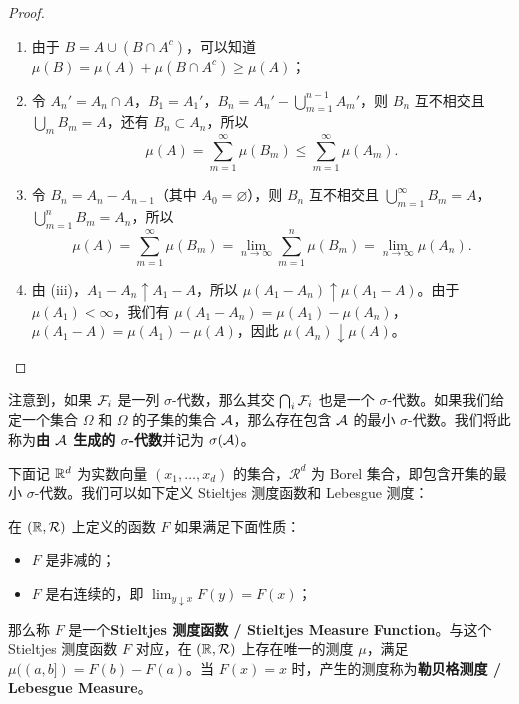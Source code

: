\begin{proof}
    \begin{enumerate}
        \item 由于 $B = A \cup (B \cap A^c)$，可以知道 $\mu(B) = \mu(A) + \mu(B \cap A^c) \ge \mu(A)$；
        \item 令 $A_n' = A_n \cap A$，$B_1 = A_1'$，$B_n = A_n' - \bigcup_{m=1}^{n-1} A_m'$，则 $B_n$ 互不相交且 $\bigcup_m B_m = A$，还有 $B_n \subset A_n$，所以
              \[
                  \mu(A) = \sum_{m=1}^{\infty} \mu(B_m) \le \sum_{m=1}^{\infty} \mu(A_m).
              \]
        \item 令 $B_n = A_n - A_{n-1}$（其中 $A_0 = \varnothing$），则 $B_n$ 互不相交且 $\bigcup_{m=1}^\infty B_m = A$，$\bigcup_{m=1}^n B_m = A_n$，所以
              \[
                  \mu(A) = \sum_{m=1}^{\infty} \mu(B_m) = \lim_{n \to \infty} \sum_{m=1}^n \mu(B_m) = \lim_{n \to \infty} \mu(A_n).
              \]
        \item 由 (iii)，$A_1 - A_n \uparrow A_1 - A$，所以 $\mu(A_1 - A_n) \uparrow \mu(A_1 - A)$。由于 $\mu(A_1) < \infty$，我们有 $\mu(A_1 - A_n) = \mu(A_1) - \mu(A_n)$，$\mu(A_1 - A) = \mu(A_1) - \mu(A)$，因此 $\mu(A_n) \downarrow \mu(A)$。
    \end{enumerate}
\end{proof}

注意到，如果 $\mathcal{F}_i$ 是一列 $\sigma$-代数，那么其交 $\bigcap_i \mathcal{F}_i$ 也是一个 $\sigma$-代数。如果我们给定一个集合 $\Omega$ 和 $\Omega$ 的子集的集合 $\mathcal{A}$，那么存在包含 $\mathcal{A}$ 的最小 $\sigma$-代数。我们将此称为{\normalfont\bfseries 由 $\mathcal{A}$ 生成的 $\sigma$-代数}并记为 $\sigma(\mathcal{A})$。

下面记 $\mathbb{R}^d$ 为实数向量 $(x_1, \dots, x_d)$ 的集合，$\mathcal{R}^d$ 为 Borel 集合，即包含开集的最小 $\sigma$-代数。我们可以如下定义 Stieltjes 测度函数和 Lebesgue 测度：

\begin{theorem}\label{theorem-1-1-2}
    在 $(\mathbb{R}, \mathcal{R})$ 上定义的函数 $F$ 如果满足下面性质：
    \begin{itemize}
        \item $F$ 是非减的；
        \item $F$ 是右连续的，即 $\lim_{y \downarrow x} F(y) = F(x)$；
    \end{itemize}
    那么称 $F$ 是一个{\normalfont\bfseries Stieltjes 测度函数 / Stieltjes Measure Function}。与这个 Stieltjes 测度函数 $F$ 对应，在 $(\mathbb{R}, \mathcal{R})$ 上存在唯一的测度 $\mu$，满足 $\mu((a,b]) = F(b) - F(a)$。当 $F(x) = x$ 时，产生的测度称为{\normalfont\bfseries 勒贝格测度 / Lebesgue Measure}。
\end{theorem}

